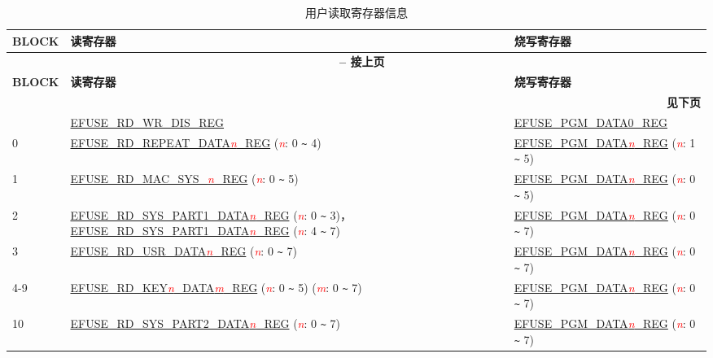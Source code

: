 \begin{longtable}[c]{|l|l|l|}
\caption{用户读取寄存器信息}
\label{tab:efuse-softw-read-para}
\\\hline
    \rowcolor{lightgray}
    \textbf{BLOCK} & \textbf{读寄存器} & \textbf{烧写寄存器}\\
    \endfirsthead    
    \multicolumn{3}{c}{\bfseries \tablename\ \thetable{} -- 接上页}\\\hline
    \rowcolor{lightgray}
    \textbf{BLOCK} & \textbf{读寄存器} & \textbf{烧写寄存器}\\
    \endhead
    \multicolumn{3}{r}{\textbf{见下页}} \\
    \endfoot
    \endlastfoot
    \hline
    0 & \hyperref[regdesc:EFUSERDWRDISREG]{EFUSE\_RD\_WR\_DIS\_REG} & \hyperref[regdesc:EFUSEPGMDATANREG]{\hyperref[regdesc:EFUSEPGMDATANREG]{EFUSE\_PGM\_DATA0\_REG}} \\\hline
    0 & \hyperref[regdesc:EFUSERDREPEATDATA0REG]{EFUSE\_RD\_REPEAT\_DATA\textcolor{red}{\it{n}}\_REG} (\textcolor{red}{\it{n}}: 0 \verb+~+ 4) & \hyperref[regdesc:EFUSEPGMDATANREG]{EFUSE\_PGM\_DATA\textcolor{red}{\it{n}}\_REG} (\textcolor{red}{\it{n}}: 1 \verb+~+ 5)  \\\hline
    1 & \hyperref[regdesc:EFUSERDMACSYS0REG]{EFUSE\_RD\_MAC\_SYS\_\textcolor{red}{\it{n}}\_REG} (\textcolor{red}{\it{n}}: 0 \verb+~+ 5)  & \hyperref[regdesc:EFUSEPGMDATANREG]{EFUSE\_PGM\_DATA\textcolor{red}{\it{n}}\_REG}  (\textcolor{red}{\it{n}}: 0 \verb+~+ 5) \\\hline
    2 & \hyperref[regdesc:EFUSERDSYSPART1DATA0REG]{EFUSE\_RD\_SYS\_PART1\_DATA\textcolor{red}{\it{n}}\_REG} (\textcolor{red}{\it{n}}: 0 \verb+~+ 3)，\hyperref[regdesc:EFUSERDSYSPART1DATA4TO7REG]{EFUSE\_RD\_SYS\_PART1\_DATA\textcolor{red}{\it{n}}\_REG} (\textcolor{red}{\it{n}}: 4 \verb+~+ 7) & \hyperref[regdesc:EFUSEPGMDATANREG]{EFUSE\_PGM\_DATA\textcolor{red}{\it{n}}\_REG}  (\textcolor{red}{\it{n}}: 0 \verb+~+ 7) \\\hline
    3 & \hyperref[regdesc:EFUSERDUSRDATANREG]{EFUSE\_RD\_USR\_DATA\textcolor{red}{\it{n}}\_REG} (\textcolor{red}{\it{n}}: 0 \verb+~+ 7) & \hyperref[regdesc:EFUSEPGMDATANREG]{EFUSE\_PGM\_DATA\textcolor{red}{\it{n}}\_REG} (\textcolor{red}{\it{n}}: 0 \verb+~+ 7)  \\ \hline
    4-9 & \hyperref[regdesc:EFUSERDKEY0DATANREG]{EFUSE\_RD\_KEY\textcolor{red}{\it{n}}\_DATA\textcolor{red}{\it{m}}\_REG} (\textcolor{red}{\it{n}}: 0 \verb+~+ 5) (\textcolor{red}{\it{m}}: 0 \verb+~+ 7)  & \hyperref[regdesc:EFUSEPGMDATANREG]{EFUSE\_PGM\_DATA\textcolor{red}{\it{n}}\_REG} (\textcolor{red}{\it{n}}: 0 \verb+~+ 7)  \\\hline
    10 & \hyperref[regdesc:EFUSERDSYSPART2DATANREG]{EFUSE\_RD\_SYS\_PART2\_DATA\textcolor{red}{\it{n}}\_REG} (\textcolor{red}{\it{n}}: 0 \verb+~+ 7) & \hyperref[regdesc:EFUSEPGMDATANREG]{EFUSE\_PGM\_DATA\textcolor{red}{\it{n}}\_REG} (\textcolor{red}{\it{n}}: 0 \verb+~+ 7) \\\hline
\end{longtable}
